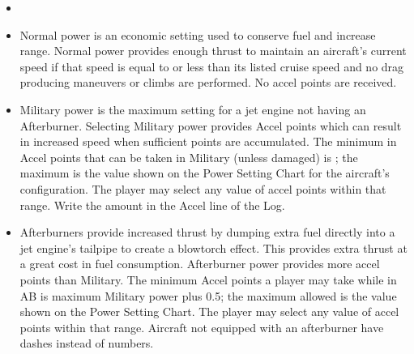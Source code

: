 \begin{itemize}
    \item{} 


    \item{} Normal power is an economic setting used to conserve fuel and increase range. Normal power provides enough thrust to maintain an aircraft's current speed if that speed is equal to or less than its listed cruise speed and no drag producing maneuvers or climbs are performed. No accel points are received.

    \item{} Military power is the maximum setting for a jet engine not having an Afterburner. Selecting Military power provides Accel points which can result in increased speed when sufficient points are accumulated. The minimum in Accel points that can be taken in Military (unless damaged) is ; the maximum is the value shown on the Power Setting Chart for the aircraft's configuration.  The player may select any value of accel points within that range. Write the amount in the Accel line of the Log.

    \item{} Afterburners provide increased thrust by dumping extra fuel directly into a jet engine's tailpipe to create a blowtorch effect. This provides extra thrust at a great cost in fuel consumption. Afterburner power provides more accel points than Military. The minimum Accel points a player may take while in AB is maximum Military power plus 0.5; the maximum allowed is the value shown on the Power Setting Chart. The player may select any value of accel points within that range. Aircraft not equipped with an afterburner have dashes instead of numbers.

\end{itemize}

